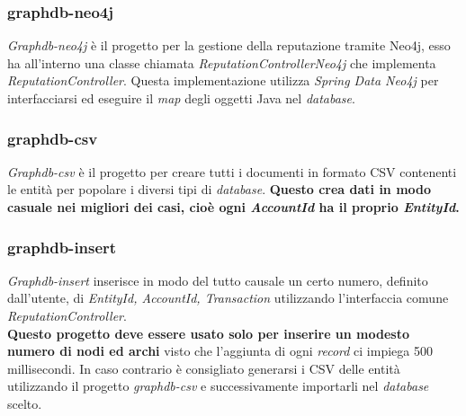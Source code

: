\subsubsection{graphdb-neo4j}
\textit{Graphdb-neo4j} è il progetto per la gestione della reputazione tramite Neo4j, esso ha all'interno una classe chiamata \textit{ReputationControllerNeo4j} che implementa \textit{ReputationController}. Questa implementazione utilizza \textit{Spring Data Neo4j} per interfacciarsi ed eseguire il \textit{map} degli oggetti Java nel \textit{database}.


\subsubsection{graphdb-csv}
\textit{Graphdb-csv} è il progetto per creare tutti i documenti in formato CSV contenenti le entità per popolare i diversi tipi di \textit{database}. \textbf{Questo crea dati in modo casuale nei migliori dei casi, cioè ogni \textit{AccountId} ha il proprio \textit{EntityId}.}\\

\subsubsection{graphdb-insert}
\textit{Graphdb-insert} inserisce in modo del tutto causale un certo numero, definito dall'utente, di \textit{EntityId, AccountId, Transaction} utilizzando l'interfaccia comune \textit{ReputationController}.\\
\textbf{Questo progetto deve essere usato solo per inserire un modesto numero di nodi ed archi} visto che l'aggiunta di ogni \textit{record} ci impiega 500 millisecondi. In caso contrario è consigliato generarsi i CSV delle entità utilizzando il progetto \textit{graphdb-csv} e successivamente importarli nel \textit{database} scelto.
